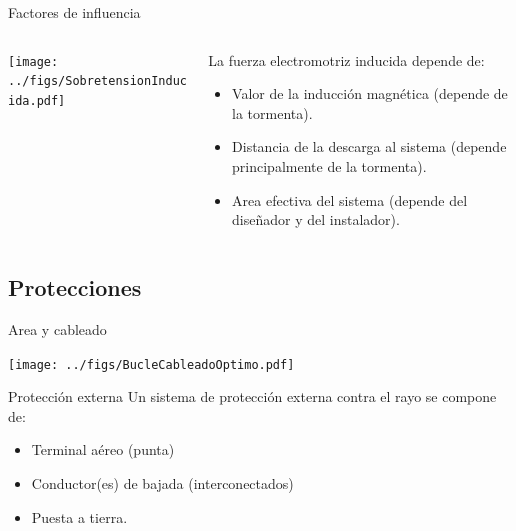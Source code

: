 \documentclass[aspectratio=169, usenames,svgnames,dvipsnames]{beamer}
\begin{document}
\begin{frame}[label={sec:org5fc399a},plain]{Factores de influencia}
\begin{columns}
\begin{column}{0.4\columnwidth}
\begin{center}
\texttt{[image: ../figs/SobretensionInducida.pdf]}
\end{center}
\end{column}
\begin{column}{0.6\columnwidth}
La fuerza electromotriz inducida depende de:

\begin{itemize}
\item \alert{Valor de la inducción magnética} (depende de la tormenta).

\item \alert{Distancia} de la descarga al sistema (depende principalmente de la
tormenta).

\item \alert{Area efectiva del sistema} (depende del diseñador y del instalador).
\end{itemize}
\end{column}
\end{columns}
\end{frame}

\subsection{Protecciones}
\label{sec:orgcc2bab5}


\begin{frame}[label={sec:orgd8a6abc}]{Area y cableado}
\begin{center}
\texttt{[image: ../figs/BucleCableadoOptimo.pdf]}
\end{center}
\end{frame}

\begin{frame}[label={sec:org1faac45}]{Protección externa}
Un sistema de protección externa contra el rayo se compone de:

\begin{itemize}
\item Terminal aéreo (punta)

\item Conductor(es) de bajada (interconectados)

\item Puesta a tierra.
\end{itemize}
\end{frame}
\end{document}
